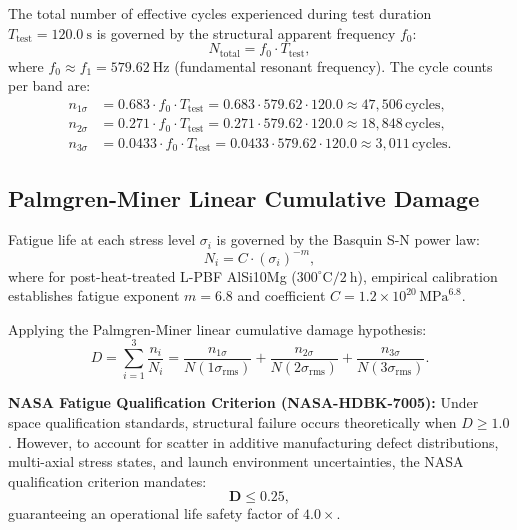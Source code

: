 The total number of effective cycles experienced during test duration $T_{\text{test}} = \SI{120.0}{\second}$ is governed by the structural apparent frequency $f_0$:
\begin{equation}
N_{\text{total}} = f_0 \cdot T_{\text{test}},
\label{eq:total_cycles}
\end{equation}
where $f_0 \approx f_1 = \SI{579.62}{\hertz}$ (fundamental resonant frequency). The cycle counts per band are:
\begin{align}
n_{1\sigma} &= 0.683 \cdot f_0 \cdot T_{\text{test}} = 0.683 \cdot 579.62 \cdot 120.0 \approx 47{,}506\,\text{cycles}, \\
n_{2\sigma} &= 0.271 \cdot f_0 \cdot T_{\text{test}} = 0.271 \cdot 579.62 \cdot 120.0 \approx 18{,}848\,\text{cycles}, \\
n_{3\sigma} &= 0.0433 \cdot f_0 \cdot T_{\text{test}} = 0.0433 \cdot 579.62 \cdot 120.0 \approx 3{,}011\,\text{cycles}.
\end{align}

\subsection{Palmgren-Miner Linear Cumulative Damage}

Fatigue life at each stress level $\sigma_i$ is governed by the Basquin S-N power law:
\begin{equation}
N_i = C \cdot \left(\sigma_i\right)^{-m},
\label{eq:basquin_law}
\end{equation}
where for post-heat-treated L-PBF AlSi10Mg ($300^\circ\text{C} / \SI{2}{\hour}$), empirical calibration establishes fatigue exponent $m = 6.8$ and coefficient $C = 1.2 \times 10^{20}\,\text{MPa}^{6.8}$.

Applying the Palmgren-Miner linear cumulative damage hypothesis:
\begin{equation}
D = \sum_{i=1}^{3} \frac{n_i}{N_i} = \frac{n_{1\sigma}}{N(1\sigma_{\text{rms}})} + \frac{n_{2\sigma}}{N(2\sigma_{\text{rms}})} + \frac{n_{3\sigma}}{N(3\sigma_{\text{rms}})}.
\label{eq:palmgren_miner_steinberg}
\end{equation}

\begin{svgraybox}
\textbf{NASA Fatigue Qualification Criterion (NASA-HDBK-7005):}
Under space qualification standards, structural failure occurs theoretically when $D \ge 1.0$. However, to account for scatter in additive manufacturing defect distributions, multi-axial stress states, and launch environment uncertainties, the NASA qualification criterion mandates:
\begin{equation}
\mathbf{D \le 0.25},
\label{eq:nasa_fatigue_limit}
\end{equation}
guaranteeing an operational life safety factor of $\mathbf{4.0\times}$.
\end{svgraybox}


